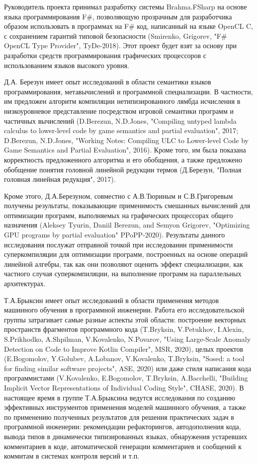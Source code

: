 \documentclass[12pt]{article}  %
\theoremstyle{remark}
\begin{document}
Руководитель проекта принимал разработку системы Brahma.FSharp на основе языка программирования F#, позволяющую прозрачным для разработчика образом использовать в программах на F# код, написанный на языке OpenCL C, с сохранением гарантий типовой безопасности (Smirenko, Grigorev, "F# OpenCL Type Provider", TyDe-2018). Этот проект будет взят за основу при разработки средств программирования графических процессоров с использованием языков высокого уровня. 

Д.А. Березун имеет опыт исследований в области семантики языков программирования, метавычислений и программной специализации. В частности, им предложен алгоритм компиляции нетипизированного лямбда исчисления в низкоуровневое представление посредством игровой семантики программ и частичных вычислений (D.Berezun, N.D.Jones, "Compiling untyped lambda calculus to lower-level code by game semantics and partial evaluation", 2017; D.Berezun, N.D.Jones, "Working Notes: Compiling ULC to Lower-level Code by Game Semantics and Partial Evaluation", 2016). Кроме того, им была показана корректность предложенного алгоритма и его обобщения, а также предложено обобщение понятия головной линейной редукции термов (Д.Березун, "Полная головная линейная редукция", 2017).

Кроме этого, Д.А.Березуном, совместно с А.В.Тюриным и С.В.Григоревым получены результаты, показывающие применимость смешанных вычислений для оптимизации программ, выполняемых на графических процессорах общего назначения (Aleksey Tyurin, Daniil Berezun, and Semyon Grigorev, "Optimizing GPU programs by partial evaluation" PPoPP-2020). Результаты данного исследования послужат отправной точкой при исследовании применимости суперкомпиляции для оптимизации программ, построенных на основе операций линейной алгебры, так как они позволяют оценить эффект специализации, как частного случая суперкомпиляции, на выполнение программ на параллельных архитектурах.

Т.А.Брыксин имеет опыт исследований в области применения методов машинного обучения в программной инженерии. Работа его исследовательской группы затрагивает самые разные аспекты этой области: построение векторных пространств фрагментов программного кода (T.Bryksin, V.Petukhov, I.Alexin, S.Prikhodko, A.Shpilman, V.Kovalenko, N.Povarov, "Using Large-Scale Anomaly Detection on Code to Improve Kotlin Compiler", MSR, 2020), целых проектов (E.Bogomolov, Y.Golubev, A.Lobanov, V.Kovalenko, T.Bryksin, "Sosed: a tool for finding similar software projects", ASE, 2020) или даже стиля написания кода программистами (V.Kovalenko, E.Bogomolov, T.Bryksin, A.Bacchelli, "Building Implicit Vector Representations of Individual Coding Style", CHASE, 2020). В настоящее время в группе Т.А.Брыксина ведутся исследования по созданию эффективных инструментов применения моделей машинного обучения, а также по применению полученных результатов для решения практических задач в программной инженерии: рекомендации рефакторингов, автодополнения кода, вывода типов в динамически типизированных языках, обнаружения устаревших комментариев в коде, автоматической генерации комментариев и сообщений к коммитам в системах контроля версий и т.п.
\end{document}
